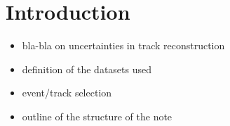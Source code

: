 \section{Introduction}
\begin{itemize}
\item bla-bla on uncertainties in track reconstruction
\item definition of the datasets used
\item event/track selection
\item outline of the structure of the note
\end{itemize}
